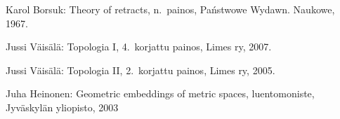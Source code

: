 \documentclass[12pt,a4paper,leqno]{report}
\theoremstyle{plain}
\theoremstyle{definition}
\theoremstyle{remark}
\begin{document}
\begin{thebibliography}{9}

Karol Borsuk: Theory of retracts, n.\ painos, Państwowe Wydawn. Naukowe, 1967.

Jussi Väisälä: Topologia I, 4.\ korjattu painos, Limes ry, 2007.

Jussi Väisälä: Topologia II, 2.\ korjattu painos, Limes ry, 2005.

Juha Heinonen: Geometric embeddings of metric spaces, luentomoniste, Jyväskylän yliopisto, 2003


\end{thebibliography}
\end{document}
